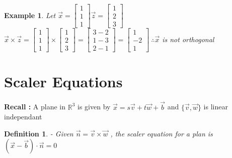 \documentclass{article}
\newtheorem{ex}[theorem]{Example}
\newtheorem{definition}[theorem]{Definition}
\begin{document}
\begin{ex} 
Let \( \vec{x} = \begin{bmatrix} 1 \\ 1 \\ 1\end{bmatrix}  \vec{z} = \begin{bmatrix} 1 \\ 2 \\ 3\end{bmatrix} \) \\
\( \vec{x} \times \vec{z} = \begin{bmatrix} 1 \\ 1 \\ 1 \end{bmatrix} \times \begin{bmatrix} 1 \\ 2 \\ 3 \end{bmatrix}  = \begin{bmatrix} 3-2 \\ 1-3 \\ 2-1 \end{bmatrix} = \begin{bmatrix} 1 \\ -2 \\ 1 \end{bmatrix}   \ \therefore \vec{x} \) is not orthogonal 
\end{ex}



\section{Scaler Equations}
\textbf{Recall : } A plane in \( \mathbb{R}^3 \) is given by \( \vec{x} = s\vec{v} + t\vec{w} + \vec{b}\) and \(\{\vec{v} , \vec{w} \}\) is linear independant

\begin{definition} 
- Given \(\vec{n} = \vec{v} \times \vec{w} \) , the scaler equation for a plan is \( (\vec{x} - \vec{b}) \cdot \vec{n} = 0 \)
\end {definition}
\end{document}
